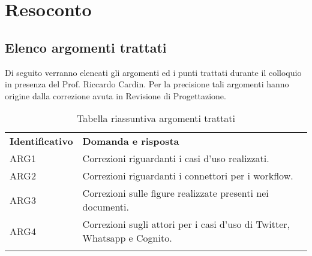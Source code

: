 \clearpage
\section{Resoconto}
	\subsection{Elenco argomenti trattati}
	\label{sec:elenco}
	Di seguito verranno elencati gli argomenti ed i punti trattati durante il colloquio in presenza del Prof. Riccardo Cardin. Per la precisione tali argomenti hanno origine dalla correzione avuta in Revisione di Progettazione.
		\begin{center}
			\renewcommand{\arraystretch}{1.5}
			\begin{longtable}{  p{2.5cm} p{11.7cm} }
				\rowcolor{tableHeadYellow}
				\textbf{Identificativo}&\textbf{Domanda e risposta}\\
				ARG1 & Correzioni riguardanti i casi d'uso realizzati.\\
				ARG2 & Correzioni riguardanti i connettori per i workflow.\\
				ARG3 & Correzioni sulle figure realizzate presenti nei documenti.\\
				ARG4 & Correzioni sugli attori per i casi d'uso di Twitter, Whatsapp e Cognito.\\
				\rowcolor{white}
				\caption{Tabella riassuntiva argomenti trattati}
			\end{longtable}	
		\end{center}
